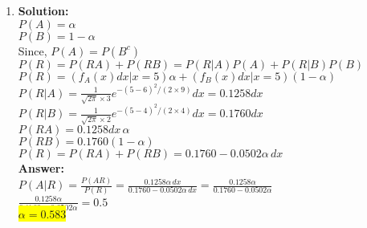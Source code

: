 \documentclass{article}
\newcommand{\myansw}{\textbf{Answer:}\\}
\newcommand{\mysolu}{\textbf{Solution:}\\}
\begin{document}
\begin{enumerate}
\begin{enumerate}
	\end{enumerate}
	\item 
	\mysolu
	${P(A) = \alpha}$\\
	${P(B) = 1-\alpha}$\\
	Since, ${P(A) = P(B^c)}$\\
	${P(R) = P(RA)+P(RB)=P(R|A)P(A)+P(R|B)P(B)}$\\
	${P(R) = (f_A(x)dx|x = 5)\alpha + (f_B(x)dx|x = 5)(1-\alpha)}$\\
	${P(R|A) = \frac{1}{\sqrt{2\pi}\times3}e^{-(5-6)^2/(2\times 9)} dx = 0.1258 dx}$\\
	${P(R|B) = \frac{1}{\sqrt{2\pi}\times2}e^{-(5-4)^2/(2\times 4)} dx = 0.1760 dx}$\\
	${P(RA) = 0.1258 dx \, \alpha}$\\
	${P(RB) = 0.1760 (1 - \alpha)}$\\
	${P(R) = P(RA)+P(RB) = 0.1760 - 0.0502 \alpha \, dx}$\\
	\myansw
	${P(A|R) = \frac{P(AR)}{P(R)}=\frac{0.1258 \alpha \,dx }{0.1760 - 0.0502  \alpha \, dx}=\frac{0.1258 \alpha  }{0.1760 - 0.0502 \alpha}}$\\
	${\frac{ 0.1258 \alpha  }{0.1760 - 0.0502 \alpha}=0.5}$\\
	\colorbox{yellow}{
		${\alpha = 0.583}$
	}\\


\end{enumerate}
\end{document}
